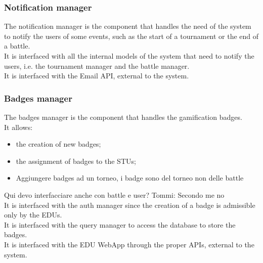 \subsubsection*{Notification manager}
The notification manager is the component that handles the need of the system to notify the users of some events, such as the start of a tournament or the end of a battle. \\
It is interfaced with all the internal models of the system that need to notify the users, i.e. the tournament manager and the battle manager. \\
It is interfaced with the Email API, external to the system.

\subsubsection*{Badges manager}
The badges manager is the component that handles the gamification badges. \\
It allows:
\begin{itemize}
    \item the creation of new badges;
    \item the assignment of badges to the STUs;
    \item {\color{red} Aggiungere badges ad un torneo, i badge sono del torneo non delle battle}
\end{itemize}
{\color{red} Qui devo interfacciare anche con battle e user? Tommi: Secondo me no\\}
It is interfaced with the auth manager since the creation of a badge is admissible only by the EDUs. \\
It is interfaced with the query manager to access the database to store the badges. \\
It is interfaced with the EDU WebApp through the proper APIs, external to the system.

